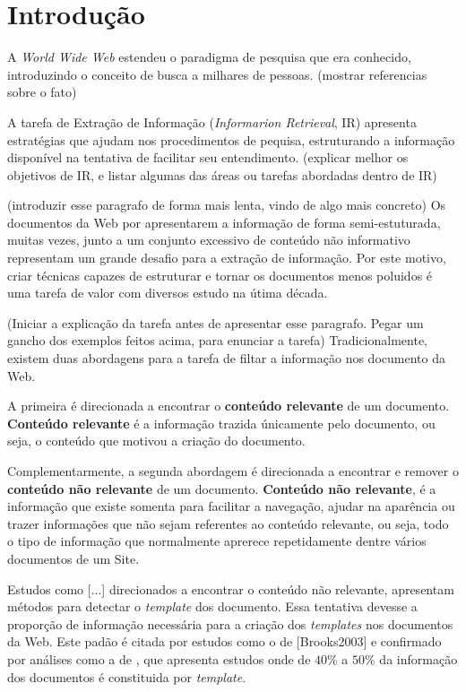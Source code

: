 \documentclass{acm_proc_article-sp}
\newcommand{\remove}[1]{}
\numberwithin{equation}{section}
\begin{document}
\newpage

\section{Introdução}

A {\it World Wide Web} estendeu o paradigma de pesquisa que era conhecido, 
	introduzindo o conceito de busca a milhares de pessoas. (mostrar
  referencias sobre o fato)


A tarefa de Extração de Informação ({\it Informarion Retrieval}, IR) apresenta 
	estratégias que ajudam nos procedimentos de pequisa, estruturando a 
	informação disponível na tentativa de facilitar seu entendimento.
  (explicar melhor os objetivos de IR, e listar algumas das áreas ou
  tarefas abordadas dentro de IR)

(introduzir esse paragrafo de forma mais lenta, vindo de algo mais
concreto)
Os documentos da Web por apresentarem a informação de forma semi-estuturada,
	muitas vezes, junto a um conjunto excessivo de conteúdo não informativo
	representam um grande desafio para a extração de informação. 
Por este motivo,
	criar técnicas capazes de estruturar e tornar os documentos menos poluidos
	é uma tarefa de valor com diversos estudo na útima década.

\remove{
Retirar uma parcela de informação não relevante desses documentos 
	proporciona benefícios claros.
}

(Iniciar a explicação da tarefa antes de apresentar esse paragrafo.
Pegar um gancho dos exemplos feitos acima, para enunciar a tarefa)
Tradicionalmente, existem duas abordagens para a tarefa de filtar a informação
nos documento da Web. 
  \remove{, diminuindo a quantidade de dados não informativos processados.}
A primeira é direcionada a encontrar o {\bf conteúdo relevante} de um 
	documento. {\bf Conteúdo relevante} é a informação trazida únicamente pelo 
	documento, ou seja,
		o conteúdo que motivou a criação do documento.

Complementarmente, a segunda abordagem é direcionada a encontrar e remover o 
	{\bf conteúdo não relevante} de um documento. {\bf Conteúdo não relevante},
	é a informação que existe somenta para facilitar a navegação,
	ajudar na aparência ou trazer informações que não sejam referentes ao 
	conteúdo relevante, ou seja,
		todo o tipo de informação que normalmente aprerece repetidamente 
		dentre vários documentos de um Site.


Estudos como [...] direcionados a encontrar o conteúdo não relevante,
apresentam métodos para detectar o {\it template} dos documento.
	Essa tentativa devesse a proporção de informação necessária para a criação
	dos {\it templates} nos documentos da Web. Este padão é 
	citada por estudos como o de [Brooks2003] e confirmado por análises 
	como a de \cite{Gibson2005}, que apresenta estudos onde de $40\%$ a $50\%$ da 
  informação dos documentos é constituida por {\it template}.
\end{document}

